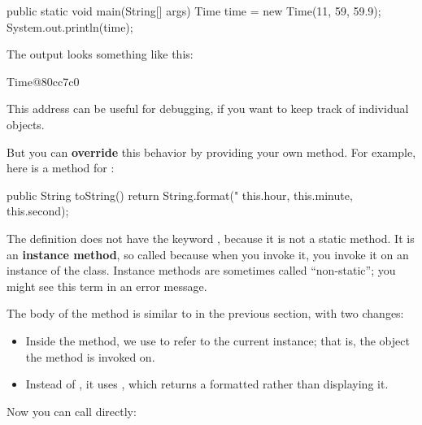 \begin{code}
public static void main(String[] args) {
    Time time = new Time(11, 59, 59.9);
    System.out.println(time);
}
\end{code}


The output looks something like this:

\begin{stdout}
Time@80cc7c0
\end{stdout}


This address can be useful for debugging, if you want to keep track of individual objects.


But you can {\bf override} this behavior by providing your own  method.
For example, here is a  method for :

\begin{code}
public String toString() {
    return String.format("%
        this.hour, this.minute, this.second);
}
\end{code}


The definition does not have the keyword , because it is not a static method.
It is an {\bf instance method}, so called because when you invoke it, you invoke it on an instance of the class.
Instance methods are sometimes called ``non-static''; you might see this term in an error message.

The body of the method is similar to  in the previous section, with two changes:

\begin{itemize}

\item Inside the method, we use  to refer to the current instance; that is, the object the method is invoked on.

\item Instead of , it uses , which returns a formatted  rather than displaying it.

\end{itemize}


Now you can call  directly:

